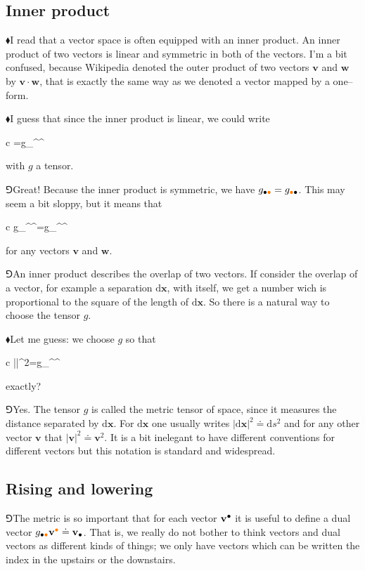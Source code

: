 \documentclass[11pt,oneside%
]{memoir}
\newenvironment{eqna}{\begin{IEEEeqnarray*}{c}}{\end{IEEEeqnarray*}\ignorespacesafterend}
\newcommand{\dd}{\mathrm{d}}
\renewcommand{\vec}[1]{\mathbf{#1}}
\newcommand{\hea}{\(\blacklozenge\)\;}
\newcommand{\heb}{\(\Game\)\;}
\newcommand{\coa}{{\color{black}\bullet}}
\newcommand{\cob}{{\color{oranssi}\bullet}}
\begin{document}
\subsection{Inner product}
\hea I read that a vector space is often equipped with an inner product. An inner product of two vectors is linear and symmetric in both of the vectors. I'm a bit confused, because Wikipedia denoted the outer product of two vectors \(\vec{v}\) and \(\vec{w}\) by \(\vec{v}\cdot\vec{w}\), that is exactly the same way as we denoted a vector mapped by a one--form.

\hea I guess that since the inner product is linear, we could write
\begin{eqna}
    \vec{v}\cdot\vec{w}=g_{\coa\cob}\vec{v}^\coa\vec{w}^\cob
\end{eqna}
with \(g\) a tensor.

\heb Great! Because the inner product is symmetric, we have \(g_{\coa\cob}=g_{\cob\coa}\). This may seem a bit sloppy, but it means that
\begin{eqna}
    g_{\coa\cob}\vec{v}^\coa\vec{w}^\cob=g_{\cob\coa}\vec{v}^\coa\vec{w}^\cob
\end{eqna}
for any vectors \(\vec{v}\) and \(\vec{w}\).

\heb An inner product describes the overlap of two vectors. If consider the overlap of a vector, for example a separation \(\dd\vec{x}\), with itself, we get a number wich is proportional to the square of the length of \(\dd\vec{x}\). So there is a natural way to choose the tensor \(g\).

\hea Let me guess: we choose \(g\) so that
\begin{eqna}
    |\dd\vec{x}|^2=g_{\coa\cob}\dd\vec{x}^\coa\dd\vec{x}^\cob
\end{eqna}
exactly?

\heb Yes. The tensor \(g\) is called the metric tensor of space, since it measures the distance separated by \(\dd\vec{x}\). For \(\dd\vec{x}\) one usually writes \(|\dd\vec{x}|^2\doteq\dd s^2\) and for any other vector \(\vec{v}\) that \(|\vec{v}|^2\doteq\vec{v}^2\). It is a bit inelegant to have different conventions for different vectors but this notation is standard and widespread.
\subsection{Rising and lowering}
\heb The metric is so important that for each vector \(\vec{v}^\coa\) it is useful to define a dual vector \(g_{\coa\cob}\vec{v}^\cob\doteq\vec{v}_\coa\). That is, we really do not bother to think vectors and dual vectors as different kinds of things; we only have vectors which can be written the index in the upstairs or the downstairs.
\end{document}

